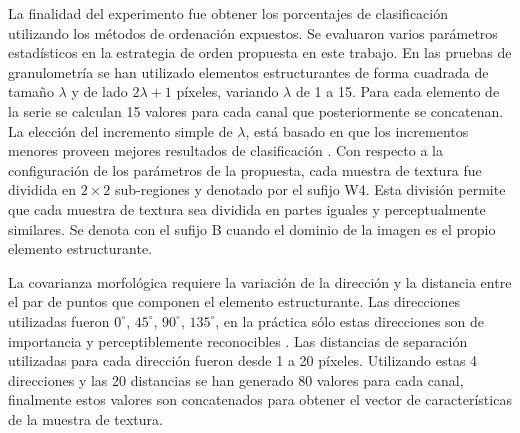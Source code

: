 La finalidad del experimento fue obtener los porcentajes de clasificación utilizando los métodos de ordenación expuestos.
Se evaluaron varios parámetros estadísticos en la estrategia de orden propuesta en este trabajo.
En las pruebas de granulometría se han utilizado elementos estructurantes de forma cuadrada de tamaño $\lambda$ y de lado $2\lambda+1$ píxeles, variando $\lambda$  de 1 a 15. Para cada elemento de la serie se calculan 15 valores para cada canal que posteriormente se concatenan. La elección del incremento simple de $\lambda$, está basado en que los incrementos menores proveen mejores resultados de clasificación \cite{de2006selecting}. 
Con respecto a la configuración de los parámetros de la propuesta, cada muestra de textura fue dividida en $2\times2$ sub-regiones y denotado por el sufijo W4. Esta división permite que cada muestra de textura sea dividida en partes iguales y perceptualmente similares. Se denota con el sufijo B cuando el dominio de la imagen es el propio elemento estructurante. 

La covarianza morfológica requiere la variación de la dirección y la distancia entre el par de puntos que componen el elemento estructurante. Las direcciones utilizadas fueron $0^{\circ}$, $45^{\circ}$, $90^{\circ}$,  $135^{\circ}$, en la práctica sólo estas direcciones son de importancia y perceptiblemente reconocibles \cite{hanbury2005illumination}. Las distancias de separación utilizadas para cada dirección fueron desde 1 a 20 píxeles. Utilizando estas 4 direcciones y las 20 distancias se han generado 80 valores para cada canal, finalmente estos valores son concatenados para obtener el vector de características de la muestra de textura. 
 
